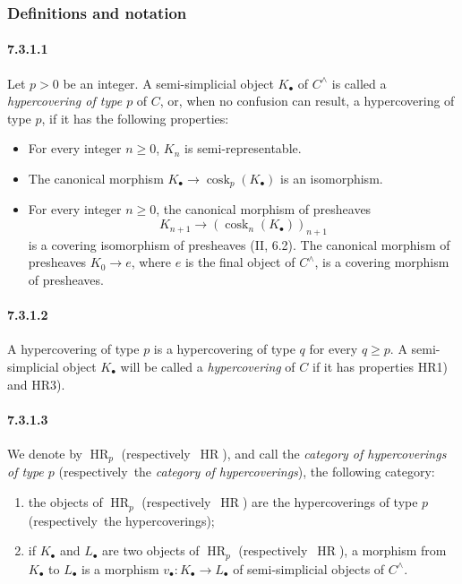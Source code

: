 \documentclass[11pt]{article}
\newcommand{\cosk}{\operatorname{cosk}}
\newcommand{\HR}{\operatorname{HR}}
\newcommand{\resp}{respectively}
\begin{document}
\subsubsection{Definitions and notation}

\paragraph*{7.3.1.1}
Let $p>0$ be an integer. A semi-simplicial object $K_\bullet$ of $C^{\wedge}$ is called a \emph{hypercovering of type $p$} of $C$, or, when no confusion can result, a hypercovering of type $p$, if it has the following properties:
\begin{itemize}
\item[HR1)] For every integer $n\geq 0$, $K_n$ is semi-representable.
\item[HR2)] The canonical morphism $K_\bullet\to\cosk_p(K_\bullet)$ is an isomorphism.
\item[HR3)] For every integer $n\geq 0$, the canonical morphism of presheaves
\[
        K_{n+1}\to (\cosk_n(K_\bullet))_{n+1}
\]
is a covering isomorphism of presheaves (II, 6.2). The canonical morphism of presheaves $K_0\to e$, where $e$ is the final object of $C^{\wedge}$, is a covering morphism of presheaves.
\end{itemize}

\paragraph*{7.3.1.2}
A hypercovering of type $p$ is a hypercovering of type $q$ for every $q\geq p$. A semi-simplicial object $K_\bullet$ will be called a \emph{hypercovering} of $C$ if it has properties HR1) and HR3).

\paragraph*{7.3.1.3}
We denote by $\HR_p$ (\resp\ $\HR$), and call the \emph{category of hypercoverings of type $p$} (\resp\ the \emph{category of hypercoverings}), the following category:
\begin{enumerate}[label=\alph*)]
\item the objects of $\HR_p$ (\resp\ $\HR$) are the hypercoverings of type $p$ (\resp\ the hypercoverings);
\item if $K_\bullet$ and $L_\bullet$ are two objects of $\HR_p$ (\resp\ $\HR$), a morphism from $K_\bullet$ to $L_\bullet$ is a morphism $v_\bullet:K_\bullet\to L_\bullet$ of semi-simplicial objects of $C^{\wedge}$.
\end{enumerate}
\end{document}
